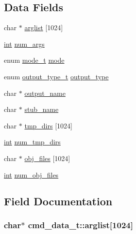 \subsection*{Data Fields}
\begin{DoxyCompactItemize}
\item 
char $\ast$ \hyperlink{structcmd__data__t_aaff0889fea578fc10e8e4fdb76647734}{arglist} \mbox{[}1024\mbox{]}
\item 
\hyperlink{pcre_8txt_a42dfa4ff673c82d8efe7144098fbc198}{int} \hyperlink{structcmd__data__t_a81628e0d9393c1b1fd598562cbe0ee0e}{num\+\_\+args}
\item 
enum \hyperlink{aplibtool_8c_a18c6d44ab22b2cd0d38a2dd0ef13ed1c}{mode\+\_\+t} \hyperlink{structcmd__data__t_a938dba58985b95bf54cdcf95e1dc2944}{mode}
\item 
enum \hyperlink{aplibtool_8c_ad9be01dbc8ada540a8a1f467700c70b6}{output\+\_\+type\+\_\+t} \hyperlink{structcmd__data__t_a4f474cb12752328c4420cc09f6f3cb34}{output\+\_\+type}
\item 
char $\ast$ \hyperlink{structcmd__data__t_aa23bfff67d2821006b4c482b7a064849}{output\+\_\+name}
\item 
char $\ast$ \hyperlink{structcmd__data__t_a27cb7d32c58e4dc2d3757a2746fc2036}{stub\+\_\+name}
\item 
char $\ast$ \hyperlink{structcmd__data__t_a3aced54205af8c44cc4d2f2b244a5c52}{tmp\+\_\+dirs} \mbox{[}1024\mbox{]}
\item 
\hyperlink{pcre_8txt_a42dfa4ff673c82d8efe7144098fbc198}{int} \hyperlink{structcmd__data__t_acc6a8a639335ee75007131b515c5666a}{num\+\_\+tmp\+\_\+dirs}
\item 
char $\ast$ \hyperlink{structcmd__data__t_a05d5216a102805043dab289cf475f842}{obj\+\_\+files} \mbox{[}1024\mbox{]}
\item 
\hyperlink{pcre_8txt_a42dfa4ff673c82d8efe7144098fbc198}{int} \hyperlink{structcmd__data__t_a7f8083e347a9db3929cc86158c6b8590}{num\+\_\+obj\+\_\+files}
\end{DoxyCompactItemize}


\subsection{Field Documentation}
\subsubsection[{\texorpdfstring{arglist}{arglist}}]{\setlength{\rightskip}{0pt plus 5cm}char$\ast$ cmd\+\_\+data\+\_\+t\+::arglist\mbox{[}1024\mbox{]}}\hypertarget{structcmd__data__t_aaff0889fea578fc10e8e4fdb76647734}{}\label{structcmd__data__t_aaff0889fea578fc10e8e4fdb76647734}
